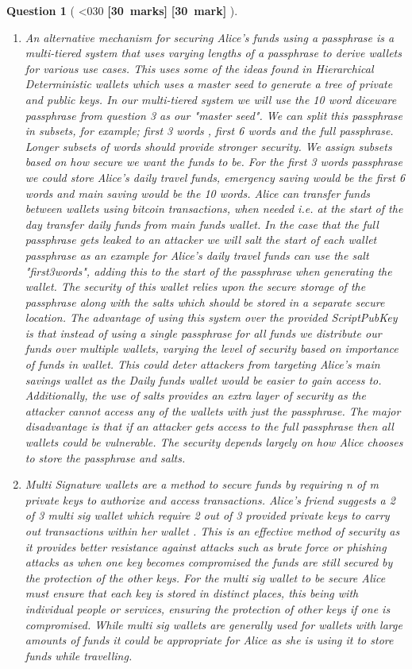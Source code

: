 \documentclass[a4paper]{article}
\theoremstyle{que}
\newtheorem{question}{Question}
\newcommand\points[1]{%
\ifnum1<0#1\relax%
    {\bf \small [#1~marks]}%
  \else%
    {\bf \small [#1~mark]}%
  \fi%
}%
\begin{document}
\begin{question}[\points{30}]
\begin{enumerate}[label=(\alph*)]
    \item An alternative mechanism for securing Alice's funds using a passphrase is a multi-tiered system that uses varying lengths of a passphrase to derive wallets for various use cases. This uses some of the ideas found in Hierarchical Deterministic wallets \cite{BIP32} which uses a master seed to generate a tree of private and public keys. In our multi-tiered system we will use the 10 word diceware passphrase from question 3 as our "master seed". We can split this passphrase in subsets, for example; first 3 words , first 6 words and the full passphrase. Longer subsets of words should provide stronger security. We assign subsets based on how secure we want the funds to be. For the first 3 words passphrase we could store Alice's daily travel funds, emergency saving would be the first 6 words and main saving would be the 10 words. Alice can transfer funds between wallets using bitcoin transactions, when needed i.e. at the start of the day transfer daily funds from main funds wallet. In the case that the full passphrase gets leaked to an attacker we will salt the start of each wallet passphrase as an example for Alice's daily travel funds can use the salt "first3words", adding this to the start of the passphrase when generating the wallet. The security of this wallet relies upon the secure storage of the passphrase along with the salts which should be stored in a separate secure location. The advantage of using this system over the provided ScriptPubKey is that instead of using a single passphrase for all funds we distribute our funds over multiple wallets, varying the level of security based on importance of funds in wallet. This could deter attackers from targeting Alice's main savings wallet as the Daily funds wallet would be easier to gain access to. Additionally, the use of salts provides an extra layer of security as the attacker cannot access any of the wallets with just the passphrase. The major disadvantage is that if an attacker gets access to the full passphrase then all wallets could be vulnerable. The security depends largely on how Alice chooses to store the passphrase and salts.
    
    \item Multi Signature wallets are a method to secure funds by requiring n of m private keys to authorize and access transactions. Alice's friend suggests a 2 of 3 multi sig wallet which require 2 out of 3 provided private keys to carry out transactions within her wallet \cite{coinbase_multisig_wallet}. This is an effective method of security as it provides better resistance against attacks such as brute force or phishing attacks as when one key becomes compromised the funds are still secured by the protection of the other keys. For the multi sig wallet to be secure Alice must ensure that each key is stored in distinct places, this being with individual people or services, ensuring the protection of other keys if one is compromised. While multi sig wallets are generally used for wallets with large amounts of funds it could be appropriate for Alice as she is using it to store funds while travelling.
    

\end{enumerate}
\end{question}
\end{document}
